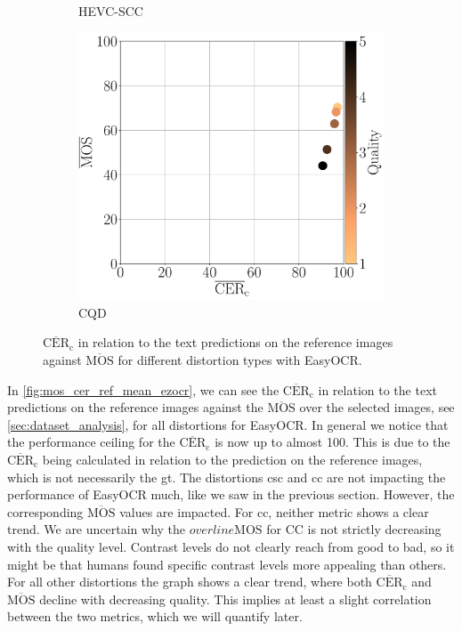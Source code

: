 \begin{figure}[h!]
\begin{subfigure}[b]{0.32\textwidth}
        \caption{HEVC-SCC}
        \label{fig:mos_cer_ref_mean_ezocr_HEVC-SCC}
    \end{subfigure}%
    \hfill
    \begin{subfigure}[b]{0.32\textwidth}
        \includegraphics[width=\textwidth]{../../images/analyze/mos_cer_ref_mean_ezocr_CQD.pdf}
        \caption{CQD}
        \label{fig:mos_cer_ref_mean_ezocr_CQD}
    \end{subfigure}%
    \caption{$\overline{\text{CER}}_{\text{c}}$ in relation to the text predictions on the reference images against $\overline{\text{MOS}}$ for different distortion types with EasyOCR.}
\label{fig:mos_cer_ref_mean_ezocr}
\end{figure}

In \autoref{fig:mos_cer_ref_mean_ezocr}, we can see the $\overline{\text{CER}}_{\text{c}}$ in relation to the text predictions on the reference images against the $\overline{\text{MOS}}$ over the selected images, see \autoref{sec:dataset_analysis}, for all distortions for EasyOCR.
In general we notice that the performance ceiling for the $\overline{\text{CER}}_{\text{c}}$ is now up to almost 100.
This is due to the $\overline{\text{CER}}_{\text{c}}$ being calculated in relation to the prediction on the reference images, which is not necessarily the \gls{gt}.
The distortions \gls{csc} and \gls{cc} are not impacting the performance of EasyOCR much, like we saw in the previous section.
However, the corresponding $\overline{\text{MOS}}$ values are impacted.
For \gls{cc}, neither metric shows a clear trend.
We are uncertain why the $overline{\text{MOS}}$ for CC is not strictly decreasing with the quality level.
Contrast levels do not clearly reach from good to bad, so it might be that humans found specific contrast levels more appealing than others.
For all other distortions the graph shows a clear trend, where both $\overline{\text{CER}}_{\text{c}}$ and $\overline{\text{MOS}}$ decline with decreasing quality.
This implies at least a slight correlation between the two metrics, which we will quantify later.

